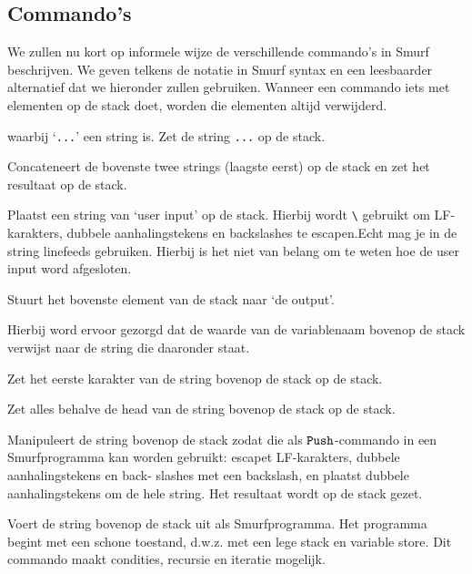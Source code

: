 \subsection{Commando's}
\label{sec:intro:commands}
We zullen nu kort op informele wijze de verschillende commando's in Smurf
beschrijven. We geven telkens de notatie in Smurf syntax en een leesbaarder
alternatief dat we hieronder zullen gebruiken. Wanneer een commando iets met
elementen op de stack doet, worden die elementen altijd verwijderd.

\begin{description}[style=nextline,font=\normalfont]
	\item[\smurfinline{"..."} of $\StmPush~\texttt{...}$]
		waarbij `\texttt{...}' een string is. Zet de string \texttt{...} op de
		stack.
	\item[\smurfinline{+} of $\StmCat$]
		Concateneert de bovenste twee strings (laagste eerst) op de stack en zet
		het resultaat op de stack.
	\item[\smurfinline{i} of $\StmInput$]
		Plaatst een string van `user input' op de stack. Hierbij wordt
		\texttt{\textbackslash} gebruikt om LF-karakters, dubbele aanhalingstekens
		en backslashes te escapen.Echt mag je in de string linefeeds gebruiken. Hierbij is het niet van belang om te weten hoe de user input word afgesloten.
	\item[\smurfinline{o} of $\StmOutput$]
		Stuurt het bovenste element van de stack naar `de output'.
	\item[\smurfinline{p} of $\StmPut$]
	    Hierbij word ervoor gezorgd dat de waarde van de variablenaam bovenop de stack verwijst naar de string die daaronder staat. \item[\smurfinline{h} of $\StmHead$]
		Zet het eerste karakter van de string bovenop de stack op de
		stack.
	\item[\smurfinline{t} of $\StmTail$]
		Zet alles behalve de head van de string bovenop de stack op de stack.
	\item[\smurfinline{q} of $\StmQuotify$]
		Manipuleert de string bovenop de stack zodat die als $\texttt{Push}$-commando in
		een Smurfprogramma kan worden gebruikt: escapet LF-karakters, dubbele
		aanhalingstekens en back- slashes met een backslash, en plaatst dubbele
		aanhalingstekens om de hele string. Het resultaat wordt op de stack gezet.
	\item[\smurfinline{x} of $\StmExec$]
		Voert de string bovenop de stack uit als Smurfprogramma. Het programma
		begint met een schone toestand, d.w.z. met een lege stack en variable
		store. Dit commando maakt condities, recursie en iteratie mogelijk.
\end{description}

